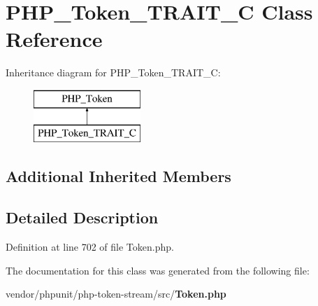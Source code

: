 \section{P\+H\+P\+\_\+\+Token\+\_\+\+T\+R\+A\+I\+T\+\_\+\+C Class Reference}
\label{class_p_h_p___token___t_r_a_i_t___c}
Inheritance diagram for P\+H\+P\+\_\+\+Token\+\_\+\+T\+R\+A\+I\+T\+\_\+\+C\+:\begin{figure}[H]
\begin{center}
\leavevmode
\includegraphics[height=2.000000cm]{class_p_h_p___token___t_r_a_i_t___c}
\end{center}
\end{figure}
\subsection*{Additional Inherited Members}


\subsection{Detailed Description}


Definition at line 702 of file Token.\+php.



The documentation for this class was generated from the following file\+:\begin{DoxyCompactItemize}
\item 
vendor/phpunit/php-\/token-\/stream/src/{\bf Token.\+php}\end{DoxyCompactItemize}
